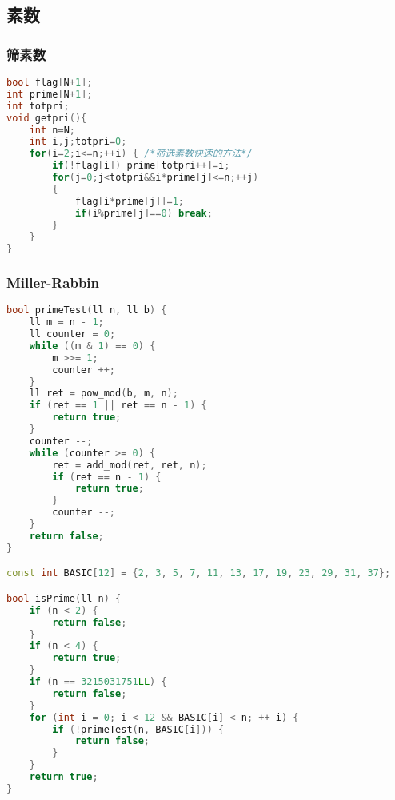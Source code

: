 \subsection{素数}
	\subsubsection{筛素数}
		\begin{lstlisting}[language=c++]
bool flag[N+1];
int prime[N+1];
int totpri;
void getpri(){
	int n=N;
	int i,j;totpri=0;
	for(i=2;i<=n;++i) { /*筛选素数快速的方法*/
		if(!flag[i]) prime[totpri++]=i; 
		for(j=0;j<totpri&&i*prime[j]<=n;++j)
		{ 
			flag[i*prime[j]]=1; 
			if(i%prime[j]==0) break; 
		} 
	} 
}
		\end{lstlisting}
	\subsubsection{Miller-Rabbin}
		\begin{lstlisting}[language=c++]
bool primeTest(ll n, ll b) {
    ll m = n - 1;
    ll counter = 0;
    while ((m & 1) == 0) {
        m >>= 1;
        counter ++;
    }
    ll ret = pow_mod(b, m, n);
    if (ret == 1 || ret == n - 1) {
        return true;
    }
    counter --;
    while (counter >= 0) {
        ret = add_mod(ret, ret, n);
        if (ret == n - 1) {
            return true;
        }
        counter --;
    }
    return false;
}

const int BASIC[12] = {2, 3, 5, 7, 11, 13, 17, 19, 23, 29, 31, 37};

bool isPrime(ll n) {
    if (n < 2) {
        return false;
    }
    if (n < 4) {
        return true;
    }
    if (n == 3215031751LL) {
        return false;
    }
    for (int i = 0; i < 12 && BASIC[i] < n; ++ i) {
        if (!primeTest(n, BASIC[i])) {
            return false;
        }
    }
    return true;
}
		\end{lstlisting}